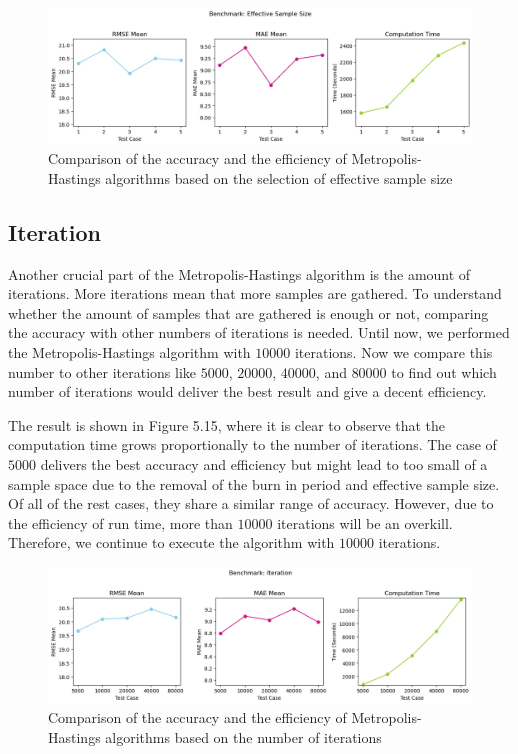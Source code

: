 \begin{figure}[H]
    \centering
    \includegraphics[width=1\textwidth]{figures/basic_mh/benchmark/effective_sample_size.png}
    \captionsetup{width=.8\textwidth}
    \caption{Comparison of the accuracy and the efficiency of Metropolis-Hastings algorithms based on the selection of effective sample size}
    \label{fig:enter-label}
\end{figure}


\subsection{Iteration}
Another crucial part of the Metropolis-Hastings algorithm is the amount of iterations. More iterations mean that more samples are gathered. To understand whether the amount of samples that are gathered is enough or not, comparing the accuracy with other numbers of iterations is needed. Until now, we performed the Metropolis-Hastings algorithm with $10000$ iterations. Now we compare this number to other iterations like $5000$, $20000$, $40000$, and $80000$ to find out which number of iterations would deliver the best result and give a decent efficiency.

The result is shown in Figure 5.15, where it is clear to observe that the computation time grows proportionally to the number of iterations. The case of $5000$ delivers the best accuracy and efficiency but might lead to too small of a sample space due to the removal of the burn in period and effective sample size. Of all of the rest cases, they share a similar range of accuracy. However, due to the efficiency of run time, more than $10000$ iterations will be an overkill. Therefore, we continue to execute the algorithm with $10000$ iterations. 

\begin{figure}[H]
    \centering
    \includegraphics[width=1\textwidth]{figures/basic_mh/benchmark/iteration.png}
    \captionsetup{width=.8\textwidth}
    \caption{Comparison of the accuracy and the efficiency of Metropolis-Hastings algorithms based on the number of iterations}
    \label{fig:enter-label}
\end{figure}


